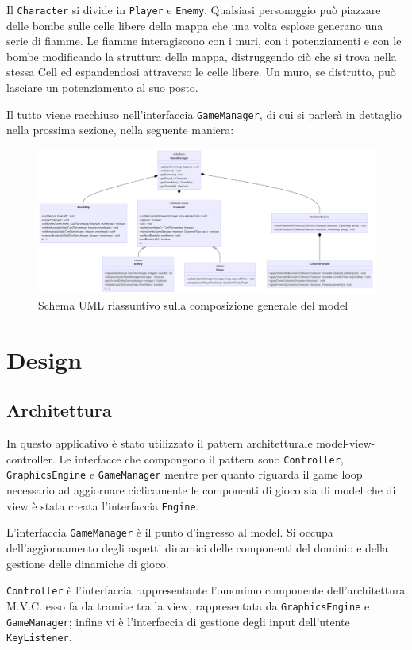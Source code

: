 \documentclass[a4paper,12pt]{report}
\begin{document}
Il \verb|Character| si divide in \verb|Player| e \verb|Enemy|. Qualsiasi personaggio può piazzare delle bombe sulle celle libere della mappa che una volta esplose generano una serie di fiamme. Le fiamme interagiscono con i muri, con i potenziamenti e con le bombe modificando la struttura della mappa, distruggendo ciò che si trova nella stessa Cell ed espandendosi attraverso le celle libere. Un muro, se distrutto, può lasciare un potenziamento al suo posto. 

Il tutto viene racchiuso nell'interfaccia \verb|GameManager|, di cui si parlerà in dettaglio nella prossima sezione, nella seguente maniera: 

\begin{figure}[h]
\centering{}
\includegraphics[width=\textwidth]{img/manager-riassunto.png}
\caption{Schema UML riassuntivo sulla composizione generale del model}
\end{figure}

\chapter{Design}

\section{Architettura}

In questo applicativo è stato utilizzato il pattern architetturale model-view-controller. Le interfacce che compongono il pattern sono \verb|Controller|, \verb|GraphicsEngine| e 
\verb|GameManager| mentre per quanto riguarda il game loop necessario ad aggiornare ciclicamente le componenti di gioco sia di model che di view è stata creata l'interfaccia \verb|Engine|.
\par
L'interfaccia \verb|GameManager| è il punto d'ingresso al model. Si occupa dell'aggiornamento degli aspetti dinamici delle componenti del dominio e della gestione delle dinamiche di gioco.
\par
\verb|Controller| è l'interfaccia rappresentante l'omonimo componente dell'architettura M.V.C. esso fa da tramite tra la view, rappresentata da \verb|GraphicsEngine| e \verb|GameManager|; infine vi è l'interfaccia di gestione degli input dell'utente \verb|KeyListener|.
\end{document}
